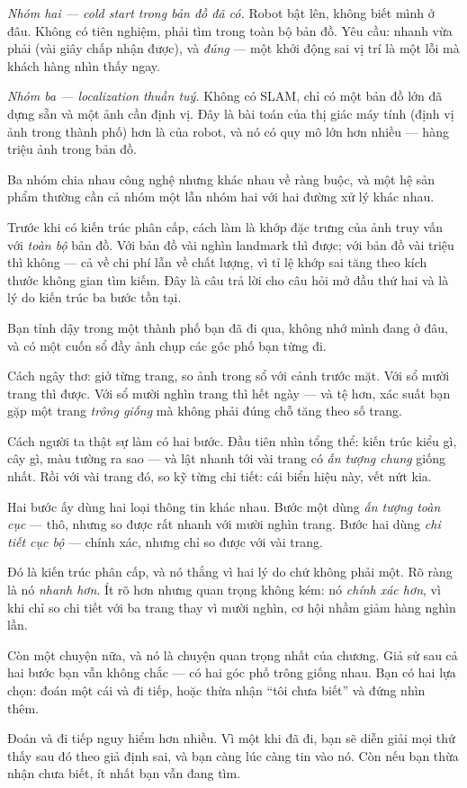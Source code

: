 \documentclass[../../vslam.tex]{subfiles}
\begin{document}
\emph{Nhóm hai --- cold start trong bản đồ đã có.} Robot bật lên, không biết mình ở đâu. Không có tiên nghiệm, phải tìm trong toàn bộ bản đồ. Yêu cầu: nhanh vừa phải (vài giây chấp nhận được), và \emph{đúng} --- một khởi động sai vị trí là một lỗi mà khách hàng nhìn thấy ngay.

\emph{Nhóm ba --- localization thuần tuý.} Không có SLAM, chỉ có một bản đồ lớn đã dựng sẵn và một ảnh cần định vị. Đây là bài toán của thị giác máy tính (định vị ảnh trong thành phố) hơn là của robot, và nó có quy mô lớn hơn nhiều --- hàng triệu ảnh trong bản đồ.

Ba nhóm chia nhau công nghệ nhưng khác nhau về ràng buộc, và một hệ sản phẩm thường cần cả nhóm một lẫn nhóm hai với hai đường xử lý khác nhau.

Trước khi có kiến trúc phân cấp, cách làm là khớp đặc trưng của ảnh truy vấn với \emph{toàn bộ} bản đồ. Với bản đồ vài nghìn landmark thì được; với bản đồ vài triệu thì không --- cả về chi phí lẫn về chất lượng, vì tỉ lệ khớp sai tăng theo kích thước không gian tìm kiếm. Đây là câu trả lời cho câu hỏi mở đầu thứ hai và là lý do kiến trúc ba bước tồn tại.

\begin{trucgiac}
Bạn tỉnh dậy trong một thành phố bạn đã đi qua, không nhớ mình đang ở đâu, và có một cuốn sổ đầy ảnh chụp các góc phố bạn từng đi.

Cách ngây thơ: giở từng trang, so ảnh trong sổ với cảnh trước mặt. Với sổ mười trang thì được. Với sổ mười nghìn trang thì hết ngày --- và tệ hơn, xác suất bạn gặp một trang \emph{trông giống} mà không phải đúng chỗ tăng theo số trang.

Cách người ta thật sự làm có hai bước. Đầu tiên nhìn tổng thể: kiến trúc kiểu gì, cây gì, màu tường ra sao --- và lật nhanh tới vài trang có \emph{ấn tượng chung} giống nhất. Rồi với vài trang đó, so kỹ từng chi tiết: cái biển hiệu này, vết nứt kia.

Hai bước ấy dùng hai loại thông tin khác nhau. Bước một dùng \emph{ấn tượng toàn cục} --- thô, nhưng so được rất nhanh với mười nghìn trang. Bước hai dùng \emph{chi tiết cục bộ} --- chính xác, nhưng chỉ so được với vài trang.

Đó là kiến trúc phân cấp, và nó thắng vì hai lý do chứ không phải một. Rõ ràng là nó \emph{nhanh hơn}. Ít rõ hơn nhưng quan trọng không kém: nó \emph{chính xác hơn}, vì khi chỉ so chi tiết với ba trang thay vì mười nghìn, cơ hội nhầm giảm hàng nghìn lần.

Còn một chuyện nữa, và nó là chuyện quan trọng nhất của chương. Giả sử sau cả hai bước bạn vẫn không chắc --- có hai góc phố trông giống nhau. Bạn có hai lựa chọn: đoán một cái và đi tiếp, hoặc thừa nhận ``tôi chưa biết'' và đứng nhìn thêm.

Đoán và đi tiếp nguy hiểm hơn nhiều. Vì một khi đã đi, bạn sẽ diễn giải mọi thứ thấy sau đó theo giả định sai, và bạn càng lúc càng tin vào nó. Còn nếu bạn thừa nhận chưa biết, ít nhất bạn vẫn đang tìm.
\end{trucgiac}
\end{document}
